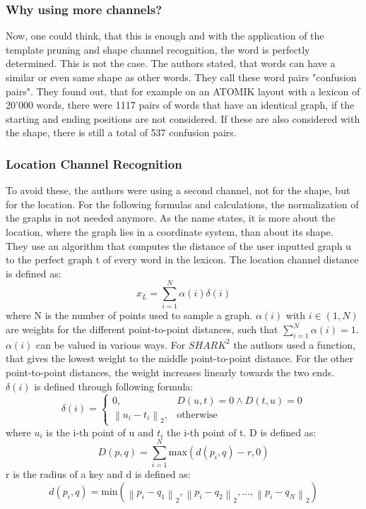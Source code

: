 \subsubsection{Why using more channels?}
Now, one could think, that this is enough and with the application of the template pruning and shape channel recognition, the word is perfectly determined. This is not the case. The authors stated, that words can have a similar or even same shape as other words. They call these word pairs "confusion pairs". They found out, that for example on an ATOMIK layout with a lexicon of 20'000 words, there were 1117 pairs of words that have an identical graph, if the starting and ending positions are not considered. If these are also considered with the shape, there is still a total of 537 confusion pairs.\\

\subsubsection{Location Channel Recognition}
To avoid these, the authors were using a second channel, not for the shape, but for the location. For the following formulas and calculations, the normalization of the graphs in not needed anymore. As the name states, it is more about the location, where the graph lies in a coordinate system, than about its shape.\\
They use an algorithm that computes the distance of the user inputted graph u to the perfect graph t of every word in the lexicon. The location channel distance is defined as:
\begin{equation}
    x_L = \sum_{i = 1}^{N}\alpha(i)\delta(i)
    \label{eqn:locationformula}
\end{equation}
where N is the number of points used to sample a graph. $\alpha(i)$ with $i \in (1,N)$ are weights for the different point-to-point distances, such that $\sum_{i = 1}^{N}\alpha(i) = 1$. $\alpha(i)$ can be valued in various ways. For $SHARK^2$ the authors used a function, that gives the lowest weight to the middle point-to-point distance. For the other point-to-point distances, the weight increases linearly towards the two ends. $\delta(i)$ is defined through following formula:
\begin{equation}
    \delta(i) =
        \begin{cases}
            0, & D(u,t) = 0 \land D(t,u) = 0 \\
            \left\lVert u_i - t_i \right\rVert_2, & \text{otherwise}
        \end{cases}
\end{equation}
where $u_i$ is the i-th point of u and $t_i$ the i-th point of t. D is defined as:
\begin{equation}
    D(p,q) = \sum_{i = 1}^{N}\text{max}(d(p_i,q) - r,0)
\end{equation}
r is the radius of a key and d is defined as:
\begin{equation}
    d(p_i,q) = \text{min}(\left\lVert p_i - q_1 \right\rVert_2, \left\lVert p_i - q_2 \right\rVert_2, \dots, \left\lVert p_i - q_N\right\rVert_2)
\end{equation}

